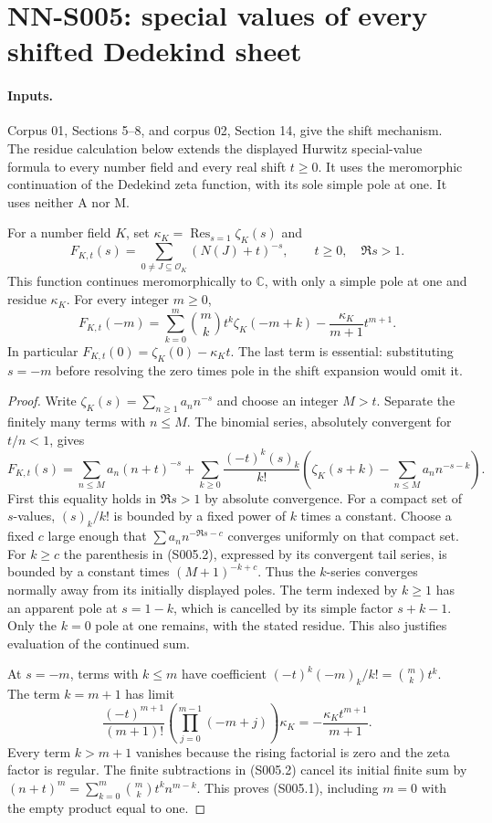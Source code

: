 \section{NN-S005: special values of every shifted Dedekind sheet}
\label{sec:NN-S005}

\paragraph{Inputs.} Corpus 01, Sections 5--8, and corpus 02,
Section 14, give the shift mechanism. The residue calculation below
extends the displayed Hurwitz special-value formula to every number
field and every real shift $t\geq0$. It uses the meromorphic
continuation of the Dedekind zeta function, with its sole simple
pole at one. It uses neither A nor M.

\begin{theorem}[NN-S005]
For a number field $K$, set $\kappa_K=\operatorname{Res}_{s=1}\zeta_K(s)$
and
\[
 F_{K,t}(s)=\sum_{0\ne J\subseteq\mathcal O_K}(N(J)+t)^{-s},
 \qquad t\geq0,\quad \Re s>1.
\]
This function continues meromorphically to $\mathbb C$, with only a
simple pole at one and residue $\kappa_K$. For every integer $m\geq0$,
\[
 \boxed{F_{K,t}(-m)=
 \sum_{k=0}^m\binom mk t^k\zeta_K(-m+k)
       -\frac{\kappa_K}{m+1}t^{m+1}.}                 \tag{S005.1}
\]
In particular $F_{K,t}(0)=\zeta_K(0)-\kappa_Kt$.
The last term is essential: substituting $s=-m$ before resolving
the zero times pole in the shift expansion would omit it.
\end{theorem}

\begin{proof}
Write $\zeta_K(s)=\sum_{n\geq1}a_n n^{-s}$ and choose an integer
$M>t$. Separate the finitely many terms with $n\leq M$. The binomial
series, absolutely convergent for $t/n<1$, gives
\[
 F_{K,t}(s)=\sum_{n\leq M}a_n(n+t)^{-s}
  +\sum_{k\geq0}\frac{(-t)^k(s)_k}{k!}
       \left(\zeta_K(s+k)-\sum_{n\leq M}a_n n^{-s-k}\right).       \tag{S005.2}
\]
First this equality holds in $\Re s>1$ by absolute convergence.
For a compact set of $s$-values, $(s)_k/k!$ is bounded by a fixed
power of $k$ times a constant. Choose a fixed $c$ large enough that
$\sum a_n n^{-\Re s-c}$ converges uniformly on that compact set.
For $k\geq c$ the parenthesis in (S005.2), expressed by its
convergent tail series, is bounded by a constant times
$(M+1)^{-k+c}$. Thus the $k$-series converges normally away from
its initially displayed poles. The term indexed by $k\geq1$ has
an apparent pole at $s=1-k$, which is cancelled by its simple
factor $s+k-1$. Only the $k=0$ pole at one remains, with the stated
residue. This also justifies evaluation of the continued sum.

At $s=-m$, terms with $k\leq m$ have coefficient
$(-t)^k(-m)_k/k!=\binom mk t^k$. The term $k=m+1$ has limit
\[
 \frac{(-t)^{m+1}}{(m+1)!}
 \left(\prod_{j=0}^{m-1}(-m+j)\right)\kappa_K
       =-\frac{\kappa_K t^{m+1}}{m+1}.
\]
Every term $k>m+1$ vanishes because the rising factorial is zero
and the zeta factor is regular. The finite subtractions in
(S005.2) cancel its initial finite sum by
$(n+t)^m=\sum_{k=0}^m\binom mk t^k n^{m-k}$.
This proves (S005.1), including $m=0$ with the empty product equal
to one.
\end{proof}

